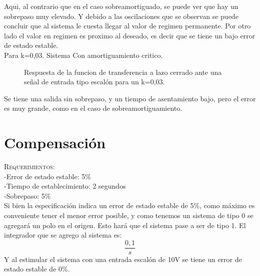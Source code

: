 \documentclass[a4paper,11pt]{article}
\begin{document}
Aqui, al contrario que en el caso sobreamortiguado, se puede ver que hay un sobrepaso muy elevado. Y debido a las oscilaciones que se observan se puede concluir que al sistema le cuesta llegar al valor de regimen permanente. Por otro lado el valor en regimen es proximo al deseado, es decir que se tiene un bajo error de estado estable.\\
Para k=0,03. Sistema Con amortiguamiento critico.\\

  \begin{figure}[H] %
	\caption{Respuesta de la funcion de transferencia a lazo cerrado ante una señal de entrada tipo escalón para un k=0,03.}
	\label{fig:resp_esc5}
	\end{figure} 
	
Se tiene una salida sin sobrepaso, y un tiempo de asentamiento bajo, pero el error es muy grande, como en el caso de sobreamortiguamiento.
	
\section{Compensación}

\textsc{Requerimientos:}\\
-Error de estado estable: 5\%\\
-Tiempo de establecimiento: 2 segundos\\
-Sobrepaso: 5\%\\

Si bien la especificación indica un error de estado estable de 5\%, como máximo es conveniente tener el menor error posible, y como tenemos un sistema de tipo 0 se agregará un polo en el origen. Esto hará que el sistema pase a ser de tipo 1.
El integrador que se agrego al sistema es:$$\frac{0,1}{s}$$
Y al estimular el sistema con una entrada escalón de 10V se tiene un error de estado estable de 0\%.\\
	
\end{document}
